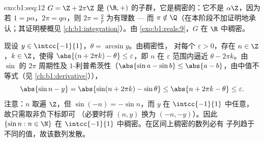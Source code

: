 \begin{solution}{exo:b1:seq:12}
$G = \Z + 2\pi\Z$ 是 $(\R, +)$ 的子群，它是稠密的：它不是
$\alpha\Z$，因为若 $1 = p\alpha$，$2\pi = q\alpha$，则 $2\pi =
\frac qp$ 为有理数 --- 而 $\pi \notin \Q$（在本阶段不加证明地承认；其证明梗概见
\cref{ch:b1:integration}）。由 \cref{exo:b1:reals:9}，$G$
在 $\R$ 中稠密。

现设 $y \in \intcc{-1}{1}$，$\theta = \arcsin y$。由稠密性，
对每个 $\varepsilon > 0$，存在 $n \in \Z$，$k \in \Z$，使得
$\abs{(n + 2\pi k) - \theta} \leq \varepsilon$，即 $n$
在 $\varepsilon$ 范围内逼近 $\theta - 2\pi k$。由 $\sin$
的 $2\pi$ 周期性及 $1$-利普希茨性（$\abs{\sin a - \sin b} \leq
\abs{a - b}$，由中值不等式（见
\cref{ch:b1:derivative}）），
\[
\abs{\sin n - y} = \abs{\sin(n + 2\pi k) - \sin\theta}
\leq \abs{n + 2\pi k - \theta} \leq \varepsilon .
\]
注意：$n$ 取遍 $\Z$，但 $\sin(-n) = -\sin n$，而 $y$
在 $\intcc{-1}{1}$ 中任意，故只需取非负下标即可
（必要时将 $(n, y)$ 换为 $(-n, -y)$）。因此 $\{\sin n : n \in
\N\}$ 在 $\intcc{-1}{1}$ 中稠密。在区间上稠密的数列必有
子列趋于不同的值，故该数列发散。
\end{solution}

